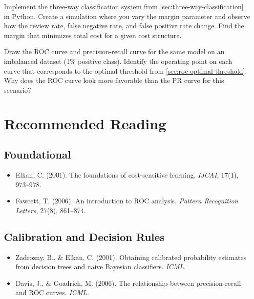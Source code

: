 \begin{Exercise}
Implement the three-way classification system from \cref{sec:three-way-classification} in Python. Create a simulation where you vary the margin parameter and observe how the review rate, false negative rate, and false positive rate change. Find the margin that minimizes total cost for a given cost structure.
\end{Exercise}

\begin{Exercise}
Draw the ROC curve and precision-recall curve for the same model on an imbalanced dataset (1\% positive class). Identify the operating point on each curve that corresponds to the optimal threshold from \cref{sec:roc-optimal-threshold}. Why does the ROC curve look more favorable than the PR curve for this scenario?
\end{Exercise}

\section{Recommended Reading}

\subsection*{Foundational}
\begin{itemize}
    \item Elkan, C. (2001). The foundations of cost-sensitive learning. \textit{IJCAI}, 17(1), 973--978.
    \item Fawcett, T. (2006). An introduction to ROC analysis. \textit{Pattern Recognition Letters}, 27(8), 861--874.
\end{itemize}

\subsection*{Calibration and Decision Rules}
\begin{itemize}
    \item Zadrozny, B., \& Elkan, C. (2001). Obtaining calibrated probability estimates from decision trees and naive Bayesian classifiers. \textit{ICML}.
    \item Davis, J., \& Goadrich, M. (2006). The relationship between precision-recall and ROC curves. \textit{ICML}.
\end{itemize}

